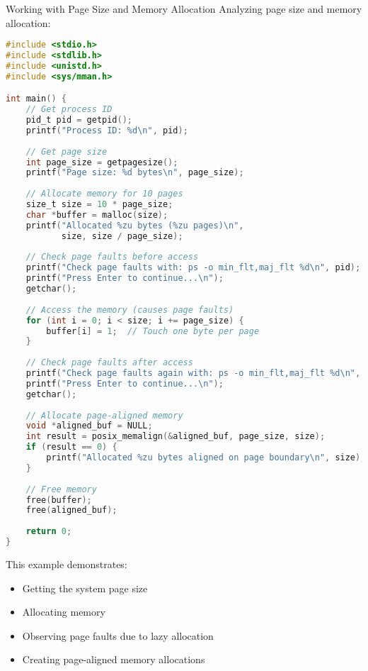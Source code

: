 \begin{example2}{Working with Page Size and Memory Allocation}
    Analyzing page size and memory allocation:
    
\begin{lstlisting}[language=C, style=basesmol]
#include <stdio.h>
#include <stdlib.h>
#include <unistd.h>
#include <sys/mman.h>

int main() {
    // Get process ID
    pid_t pid = getpid();
    printf("Process ID: %d\n", pid);
    
    // Get page size
    int page_size = getpagesize();
    printf("Page size: %d bytes\n", page_size);
    
    // Allocate memory for 10 pages
    size_t size = 10 * page_size;
    char *buffer = malloc(size);
    printf("Allocated %zu bytes (%zu pages)\n", 
           size, size / page_size);
    
    // Check page faults before access
    printf("Check page faults with: ps -o min_flt,maj_flt %d\n", pid);
    printf("Press Enter to continue...\n");
    getchar();
    
    // Access the memory (causes page faults)
    for (int i = 0; i < size; i += page_size) {
        buffer[i] = 1;  // Touch one byte per page
    }
    
    // Check page faults after access
    printf("Check page faults again with: ps -o min_flt,maj_flt %d\n", pid);
    printf("Press Enter to continue...\n");
    getchar();
    
    // Allocate page-aligned memory
    void *aligned_buf = NULL;
    int result = posix_memalign(&aligned_buf, page_size, size);
    if (result == 0) {
        printf("Allocated %zu bytes aligned on page boundary\n", size);
    }
    
    // Free memory
    free(buffer);
    free(aligned_buf);
    
    return 0;
}
\end{lstlisting}

    This example demonstrates:
    \begin{itemize}
        \item Getting the system page size
        \item Allocating memory
        \item Observing page faults due to lazy allocation
        \item Creating page-aligned memory allocations
    \end{itemize}
\end{example2}